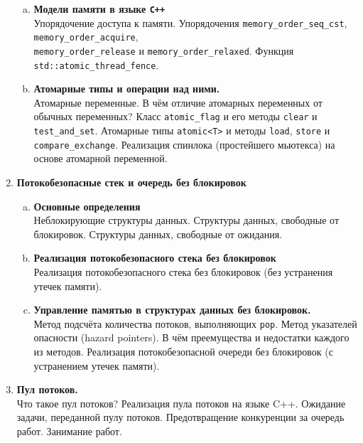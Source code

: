 \documentclass{article}
\begin{document}
\begin{enumerate}
\begin{enumerate}[a.]
\item \textbf{Модели памяти в языке \texttt{C++}}\\
Упорядочение доступа к памяти. Упорядочения \texttt{memory\_order\_seq\_cst}, \texttt{memory\_order\_acquire}, \\ \texttt{memory\_order\_release} и \texttt{memory\_order\_relaxed}. Функция \texttt{std::atomic\_thread\_fence}.


\item \textbf{Атомарные типы и операции над ними.}\\
Атомарные переменные. В чём отличие атомарных переменных от обычных переменных? Класс \texttt{atomic\_flag} и его методы \texttt{clear} и \texttt{test\_and\_set}. Атомарные типы \texttt{atomic<T>} и методы \texttt{load}, \texttt{store} и \texttt{compare\_exchange}.  Реализация спинлока (простейшего мьютекса) на основе атомарной переменной.

\end{enumerate}



\item \textbf{Потокобезопасные стек и очередь без блокировок}
\begin{enumerate}[a.]
\item \textbf{Основные определения}\\
Неблокирующие структуры данных. Структуры данных, свободные от блокировок. Структуры данных, свободные от ожидания.

\item \textbf{Реализация потокобезопасного стека без блокировок}\\
Реализация потокобезопасного стека без блокировок (без устранения утечек памяти).

\item \textbf{Управление памятью в структурах данных без блокировок.}\\
Метод подсчёта количества потоков, выполняющих \texttt{pop}. Метод указателей опасности (hazard pointers). В чём преемущества и недостатки каждого из методов. Реализация потокобезопасной очереди без блокировок (с устранением утечек памяти). 
\end{enumerate}



\item \textbf{Пул потоков.}\\
Что такое пул потоков? Реализация пула потоков на языке C++.
Ожидание задачи, переданной пулу потоков.
Предотвращение конкуренции за очередь работ. Занимание работ.



\end{enumerate}
\end{document}
